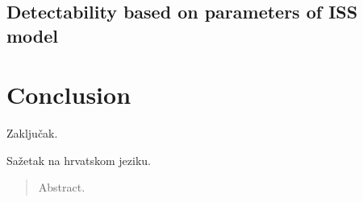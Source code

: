 \documentclass[times, utf8, diplomski]{fer}
\begin{document}
\section{Detectability based on parameters of ISS model}



\chapter{Conclusion}
Zaključak.




\begin{sazetak}
Sažetak na hrvatskom jeziku.

\end{sazetak}

\begin{abstract}
Abstract.

\end{abstract}
\end{document}
